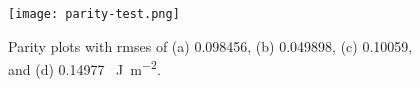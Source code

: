 \begin{figure}[h]
	\centering
	\texttt{[image: parity-test.png]}
	\label{fig:parity-test}
	\caption{Parity plots with \glspl{rmse} of (a) 0.098456, (b) 0.049898, (c) 0.10059,  and (d) 0.14977 \SI{}{\J\per\square\m}.}
\end{figure}
